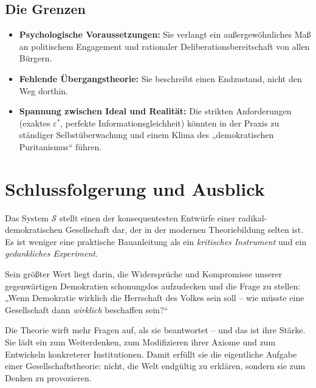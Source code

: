 \subsection{Die Grenzen}
\begin{itemize}
    \item \textbf{Psychologische Voraussetzungen:} Sie verlangt ein außergewöhnliches Maß an politischem Engagement und rationaler Deliberationsbereitschaft von allen Bürgern.
    \item \textbf{Fehlende Übergangstheorie:} Sie beschreibt einen Endzustand, nicht den Weg dorthin.
    \item \textbf{Spannung zwischen Ideal und Realität:} Die strikten Anforderungen (exaktes $\varepsilon^*$, perfekte Informationsgleichheit) könnten in der Praxis zu ständiger Selbstüberwachung und einem Klima des „demokratischen Puritanismus“ führen.
\end{itemize}

\section{Schlussfolgerung und Ausblick}
Das System $\mathcal{S}$ stellt einen der konsequentesten Entwürfe einer radikal-demokratischen Gesellschaft dar, der in der modernen Theoriebildung selten ist. Es ist weniger eine praktische Bauanleitung als ein \emph{kritisches Instrument} und ein \emph{gedankliches Experiment}.

Sein größter Wert liegt darin, die Widersprüche und Kompromisse unserer gegenwärtigen Demokratien schonungslos aufzudecken und die Frage zu stellen: „Wenn Demokratie wirklich die Herrschaft des Volkes sein soll – wie müsste eine Gesellschaft dann \emph{wirklich} beschaffen sein?“

Die Theorie wirft mehr Fragen auf, als sie beantwortet – und das ist ihre Stärke. Sie lädt ein zum Weiterdenken, zum Modifizieren ihrer Axiome und zum Entwickeln konkreterer Institutionen. Damit erfüllt sie die eigentliche Aufgabe einer Gesellschaftstheorie: nicht, die Welt endgültig zu erklären, sondern sie zum Denken zu provozieren.
